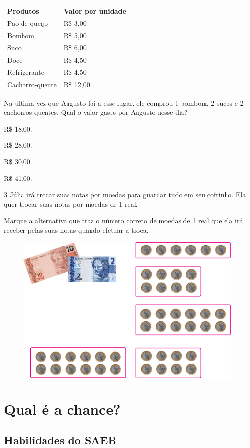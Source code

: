\begin{longtable}[]{@{}ll@{}}
\toprule
\hline
\textbf{Produtos} & \textbf{Valor por unidade}\tabularnewline
\hline
\midrule
\endhead
Pão de queijo & R\$ 3,00\tabularnewline
\hline
Bombom & R\$ 5,00\tabularnewline
\hline
Suco & R\$ 6,00\tabularnewline
\hline
Doce & R\$ 4,50\tabularnewline
\hline
Refrigerante & R\$ 4,50\tabularnewline
\hline
Cachorro-quente & R\$ 12,00\tabularnewline
\bottomrule
\end{longtable}

Na última vez que Augusto foi a esse lugar, ele comprou 1 bombom, 2
sucos e 2 cachorros-quentes. Qual o valor gasto por Augusto nesse dia?

\begin{escolha}

\item
  R\$ 18,00.
\item
  R\$ 28,00.
\item
  R\$ 30,00.
\item
  R\$ 41,00.
\end{escolha}

\num{3} Júlia irá trocar suas notas por moedas para guardar tudo em seu
cofrinho. Ela quer trocar suas notas por moedas de 1 real.

Marque a
alternativa que traz o número correto de moedas de 1 real que ela
irá receber pelas suas notas quando efetuar a troca.

\begin{figure}[htpb!]
\centering
\includegraphics[width=.65\textwidth]{./media/image74.png}
\end{figure}

\chapter{Qual é a chance?}

\section*{Habilidades do SAEB}

